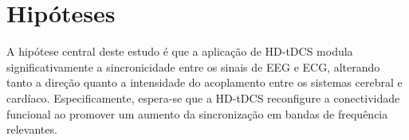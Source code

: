 \chapter{Hipóteses}
\label{chap:hipoteses}

A hipótese central deste estudo é que a aplicação de HD-tDCS modula significativamente a sincronicidade entre os sinais de EEG e ECG, alterando tanto a direção quanto a intensidade do acoplamento entre os sistemas cerebral e cardíaco. Especificamente, espera-se que a HD-tDCS reconfigure a conectividade funcional ao promover um aumento da sincronização em bandas de frequência relevantes.